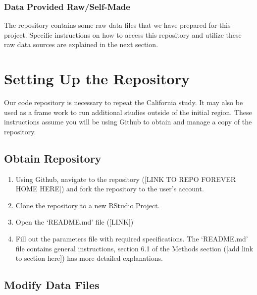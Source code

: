 \documentclass[
]{book}
\providecommand{\tightlist}{%
  \setlength{\itemsep}{0pt}\setlength{\parskip}{0pt}}
\begin{document}
\hypertarget{data-provided-rawself-made}{%
\subsection{Data Provided Raw/Self-Made}\label{data-provided-rawself-made}}

The repository contains some raw data files that we have prepared for this project. Specific instructions on how to access this repository and utilize these raw data sources are explained in the next section.

\hypertarget{setting-up-the-repository}{%
\chapter{Setting Up the Repository}\label{setting-up-the-repository}}

Our code repository is necessary to repeat the California study. It may also be used as a frame work to run additional studies outside of the initial region. These instructions assume you will be using Github to obtain and manage a copy of the repository.

\hypertarget{obtain-repository}{%
\section{Obtain Repository}\label{obtain-repository}}

\begin{enumerate}
\def\labelenumi{\arabic{enumi}.}
\tightlist
\item
  Using Github, navigate to the repository ({[}LINK TO REPO FOREVER HOME HERE{]}) and fork the repository to the user's account.
\item
  Clone the repository to a new RStudio Project.
\item
  Open the `README.md' file ({[}LINK{]})\\
\item
  Fill out the parameters file with required specifications. The `README.md' file contains general instructions, section 6.1 of the Methods section ({[}add link to section here{]}) has more detailed explanations.
\end{enumerate}

\hypertarget{modify-data-files}{%
\section{Modify Data Files}\label{modify-data-files}}
\end{document}
